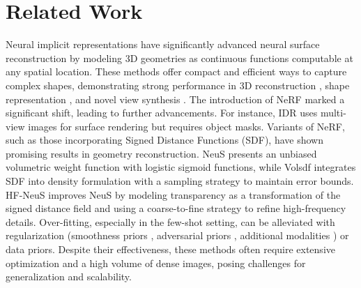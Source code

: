 \section{Related Work}
\label{sec:related_work}
\vspace{-5pt}
Neural implicit representations have significantly advanced neural surface reconstruction by modeling 3D geometries as continuous functions computable at any spatial location. These methods offer compact and efficient ways to capture complex shapes, demonstrating strong performance in 3D reconstruction \cite{darmon2022improving, jiang2020sdfdiff, kellnhofer2021neural, niemeyer2020differentiable, oechsle2021unisurf, wang2021neus, yariv2021volume, yariv2020multiview, yu2022monosdf}, shape representation \cite{atzmon2020sal, gropp2020implicit, mescheder2019occupancy, park2019deepsdf}, and novel view synthesis \cite{liu2020neural, mildenhall2021nerf, trevithick2021grf}. The introduction of NeRF \cite{mildenhall2021nerf} marked a significant shift, leading to further advancements. For instance, IDR \cite{yariv2020multiview} uses multi-view images for surface rendering but requires object masks. Variants of NeRF, such as those incorporating Signed Distance Functions (SDF), have shown promising results in geometry reconstruction. NeuS \cite{wang2021neus} presents an unbiased volumetric weight function with logistic sigmoid functions, while Volsdf \cite{yariv2021volume} integrates SDF into density formulation with a sampling strategy to maintain error bounds. HF-NeuS \cite{wang2022hf} improves NeuS by modeling transparency as a transformation of the signed distance field and using a coarse-to-fine strategy to refine high-frequency details.
Over-fitting, especially in the few-shot setting, can be alleviated with regularization (smoothness priors \eg \cite{niemeyer2021regnerf,kim2022infonerf,robust,ntps}, adversarial priors \eg \cite{dro,nap,sparseocc,augnerf}, additional modalities \eg \cite{rgbd,sparsecraft,deng2021depth,wang2023sparsenerf}) or data priors.
Despite their effectiveness, these methods often require extensive optimization and a high volume of dense images, posing challenges for generalization and scalability.\\

